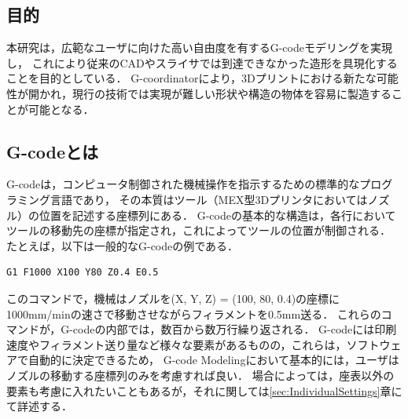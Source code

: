 \documentclass{article}
\begin{document}
\begin{twocolumn}
\subsection{目的}
本研究は，広範なユーザに向けた高い自由度を有するG-codeモデリングを実現し，
これにより従来のCADやスライサでは到達できなかった造形を具現化することを目的としている．
G-coordinatorにより，3Dプリントにおける新たな可能性が開かれ，現行の技術では実現が難しい形状や構造の物体を容易に製造することが可能となる．

\subsection{G-codeとは}
\label{sec:WhatIsGcode}
G-codeは，コンピュータ制御された機械操作を指示するための標準的なプログラミング言語であり，
その本質はツール（MEX型3Dプリンタにおいてはノズル）の位置を記述する座標列にある．
G-codeの基本的な構造は，各行においてツールの移動先の座標が指定され，これによってツールの位置が制御される．
たとえば，以下は一般的なG-codeの例である．
\begin{verbatim}
G1 F1000 X100 Y80 Z0.4 E0.5 
\end{verbatim}
このコマンドで，機械はノズルを(X, Y, Z) = (100, 80, 0.4)の座標に1000mm/minの速さで移動させながらフィラメントを0.5mm送る．
これらのコマンドが，G-codeの内部では，数百から数万行繰り返される．
G-codeには印刷速度やフィラメント送り量など様々な要素があるものの，これらは，ソフトウェアで自動的に決定できるため，
G-code Modelingにおいて基本的には，ユーザはノズルの移動する座標列のみを考慮すれば良い．
場合によっては，座表以外の要素も考慮に入れたいこともあるが，それに関しては\ref{sec:IndividualSettings}章にて詳述する．


\end{twocolumn}
\end{document}
